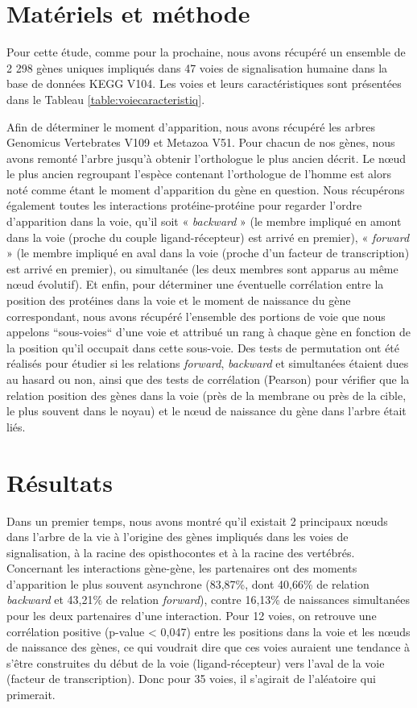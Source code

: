 \section{Matériels et méthode}
\par Pour cette étude, comme pour la prochaine, nous avons récupéré un ensemble de 2 298 gènes uniques impliqués dans 47 voies de signalisation humaine dans la base de données KEGG V104. Les voies et leurs caractéristiques sont présentées dans le Tableau \ref{table:voiecaracteristiq}. 
\par Afin de déterminer le moment d’apparition, nous avons récupéré les arbres Genomicus Vertebrates V109 et Metazoa V51. Pour chacun de nos gènes, nous avons remonté l’arbre jusqu’à obtenir l’orthologue le plus ancien décrit. Le nœud le plus ancien regroupant l’espèce contenant l’orthologue de l’homme est alors noté comme étant le moment d’apparition du gène en question. Nous récupérons également toutes les interactions protéine-protéine pour regarder l’ordre d’apparition dans la voie, qu’il soit « \textit{backward} » (le membre impliqué en amont dans la voie (proche du couple ligand-récepteur) est arrivé en premier), « \textit{forward} » (le membre impliqué en aval dans la voie (proche d’un facteur de transcription) est arrivé en premier), ou simultanée (les deux membres sont apparus au même nœud évolutif). Et enfin, pour déterminer une éventuelle corrélation entre la position des protéines dans la voie et le moment de naissance du gène correspondant, nous avons récupéré l’ensemble des portions de voie que nous appelons “sous-voies“ d’une voie et attribué un rang à chaque gène en fonction de la position qu’il occupait dans cette sous-voie. Des tests de permutation ont été réalisés pour étudier si les relations \textit{forward}, \textit{backward} et simultanées étaient dues au hasard ou non, ainsi que des tests de corrélation (Pearson) pour vérifier que la relation position des gènes dans la voie (près de la membrane ou près de la cible, le plus souvent dans le noyau) et le nœud de naissance du gène dans l’arbre était liés. 

\section{Résultats}
\par Dans un premier temps, nous avons montré qu’il existait 2 principaux nœuds dans l’arbre de la vie à l’origine des gènes impliqués dans les voies de signalisation, à la racine des opisthocontes et à la racine des vertébrés. Concernant les interactions gène-gène, les partenaires ont des moments d’apparition le plus souvent asynchrone (83,87\%, dont 40,66\% de relation \textit{backward} et 43,21\% de relation \textit{forward}), contre 16,13\% de naissances simultanées pour les deux partenaires d’une interaction. Pour 12 voies, on retrouve une corrélation positive (p-value < 0,047) entre les positions dans la voie et les nœuds de naissance des gènes, ce qui voudrait dire que ces voies auraient une tendance à s’être construites du début de la voie (ligand-récepteur) vers l’aval de la voie (facteur de transcription). Donc pour 35 voies, il s'agirait de l'aléatoire qui primerait. 

